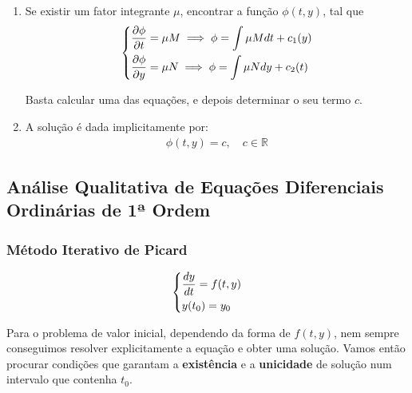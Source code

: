 \documentclass{article}
\begin{document}
\begin{enumerate}
    \medskip

    \item Se existir um fator integrante $\mu$, encontrar a função $\phi(t,y)$, tal que
    \begin{gather*}
    \begin{dcases}
    \frac{\partial \phi}{\partial t} = \mu M \implies \phi = \int \mu M dt + c_1(y) \\
    \frac{\partial \phi}{\partial y} = \mu N \implies \phi = \int \mu N dy + c_2(t)
    \end{dcases}
    \end{gather*}

    Basta calcular uma das equações, e depois determinar o seu termo $c$.

    \item A solução é dada implicitamente por:
    \begin{gather*}
    \phi(t,y) = c, \quad c \in \mathbb{R}
    \end{gather*}

\end{enumerate}

\bigskip

\subsection{Análise Qualitativa de Equações Diferenciais Ordinárias de 1ª Ordem}

\subsubsection{Método Iterativo de Picard}
\label{subsubsec: metodo-iterativo-picard}

\noindent
\begin{minipage}{0.3\textwidth}
\begin{gather*}
\begin{dcases}
\frac{dy}{dt} = f(t, y) \\
y(t_0) = y_0
\end{dcases}
\end{gather*}
\end{minipage}
\hfill
\begin{minipage}{0.65\textwidth}
Para o problema de valor inicial, dependendo da forma de $f(t,y)$, nem sempre
conseguimos resolver explicitamente a equação e obter uma solução.
Vamos então procurar condições que garantam a \textbf{existência} e a \textbf{unicidade}
de solução num intervalo que contenha $t_0$.
\end{minipage}
\end{document}
